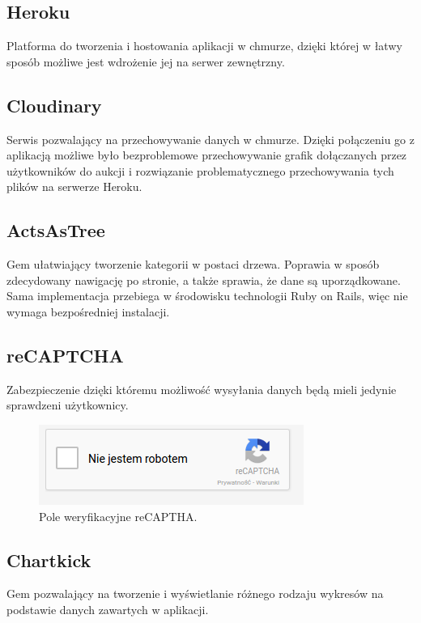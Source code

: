 \documentclass[brudnopis]{xmgr}
\begin{document}
\subsection{Heroku}

Platforma do tworzenia i hostowania aplikacji w chmurze, dzięki której w łatwy sposób możliwe jest wdrożenie jej na serwer zewnętrzny.

\subsection{Cloudinary}

Serwis pozwalający na przechowywanie danych w chmurze. Dzięki połączeniu go z aplikacją możliwe było bezproblemowe przechowywanie grafik dołączanych przez użytkowników do aukcji i rozwiązanie problematycznego przechowywania tych plików na serwerze Heroku.

\subsection{ActsAsTree}

Gem ułatwiający tworzenie kategorii w postaci drzewa. Poprawia w sposób zdecydowany nawigację
po stronie, a także sprawia, że dane są uporządkowane. Sama implementacja przebiega w środowisku
technologii Ruby on Rails, więc nie wymaga bezpośredniej instalacji.
\newpage
\subsection{reCAPTCHA}

Zabezpieczenie dzięki któremu możliwość wysyłania danych będą mieli jedynie sprawdzeni użytkownicy.

\begin{figure}[!tbh]
\centering
\includegraphics[scale=0.8]{fig/captcha}
\caption{Pole weryfikacyjne reCAPTHA.}
\end{figure}


\subsection{Chartkick}

Gem pozwalający na tworzenie i wyświetlanie różnego rodzaju wykresów na podstawie danych zawartych w aplikacji.
\end{document}
